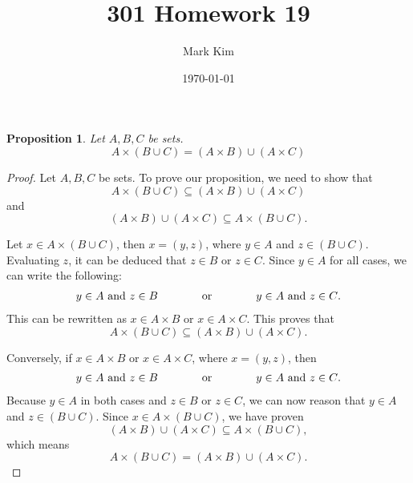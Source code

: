 \documentclass[12pt]{amsart}
\title{301 Homework 19}
\author{Mark Kim}
\date{\today}
\newtheorem*{proposition}{Proposition}
\begin{document}
\maketitle

\begin{proposition}
Let $A,B,C$ be sets.
\[
A\times(B \cup C) = (A\times B)\cup(A\times C)
\]
\end{proposition}

\begin{proof}
Let $A,B,C$ be sets.  To prove our proposition, we need to show that
\[
A\times(B \cup C) \subseteq (A\times B)\cup(A\times C)
\]
and
\[
(A\times B)\cup(A\times C) \subseteq A\times(B \cup C).
\]

Let $x\in A\times(B \cup C)$, then $x=(y,z)$, where $y\in A$ and $z\in (B\cup C)$.  Evaluating $z$, it can be deduced that $z\in B$ or $z\in C$.  Since $y\in A$ for all cases, we can write the following:
\[
\begin{tabular}{c c c c c c c}
$y\in A \text{ and } z\in B$ & \text{    } & & or & & \text{    } & $y\in A \text{ and } z\in C$.
\end{tabular}
\]
This can be rewritten as $x\in A\times B$ or $x\in A\times C$. This proves that
\[
A\times(B \cup C) \subseteq (A\times B)\cup(A\times C).
\]

Conversely, if $x\in A \times B$ or $x\in A \times C$, where $x=(y,z)$, then
\[
\begin{tabular}{c c c c c c c}
$y\in A \text{ and } z\in B$ & \text{    } & & or & & \text{    } & $y\in A \text{ and } z\in C$.
\end{tabular}
\]
Because $y\in A$ in both cases and $z\in B$ or $z\in C$, we can now reason that $y\in A$ and $z\in (B\cup C)$.  Since $x\in A\times (B\cup C)$, we have proven
\[
(A\times B)\cup(A\times C) \subseteq A\times(B \cup C),
\]
which means
\[
A\times(B \cup C) = (A\times B)\cup(A\times C).
\]
\end{proof}
\end{document}
